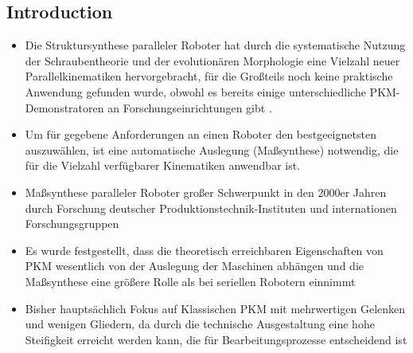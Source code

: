 \documentclass[fleqn,a4paper,10pt]{article}
\begin{document}
\vspace{18pt} %


\begin{multicols}{2}

\section{Introduction}

\begin{itemize}
\item Die Struktursynthese paralleler Roboter hat durch die systematische Nutzung der Schraubentheorie \cite{KongGos2007} und der evolutionären Morphologie \cite{Gogu2008} eine Vielzahl neuer Parallelkinematiken hervorgebracht, für die Großteils noch keine praktische Anwendung gefunden wurde, obwohl es bereits einige unterschiedliche PKM-Demonstratoren an Forschungseinrichtungen gibt \cite{Merlet2006}.
\item Um für gegebene Anforderungen an einen Roboter den bestgeeignetsten auszuwählen, ist eine automatische Auslegung (Maßsynthese) notwendig, die für die Vielzahl verfügbarer Kinematiken anwendbar ist.
\item Maßsynthese paralleler Roboter großer Schwerpunkt in den 2000er Jahren \cite{MbarekNefCor2005,Krefft2006,FrindtKreHes2010} durch Forschung deutscher Produktionstechnik-Instituten und internationen Forschungsgruppen \cite{CarboneOttCec2007,KelaiaiaComZaa2012,JamwalHusXie2015}
\item Es wurde festgestellt, dass die theoretisch erreichbaren Eigenschaften von PKM wesentlich von der Auslegung der Maschinen abhängen und die Maßsynthese eine größere Rolle als bei seriellen Robotern einnimmt \cite{Merlet2006}
\item Bisher hauptsächlich Fokus auf Klassischen PKM mit mehrwertigen Gelenken und wenigen Gliedern, da durch die technische Ausgestaltung eine hohe Steifigkeit erreicht werden kann, die für Bearbeitungsprozesse entscheidend ist \cite{MbarekNefCor2005}
\end{itemize}


\end{multicols}
\end{document}
